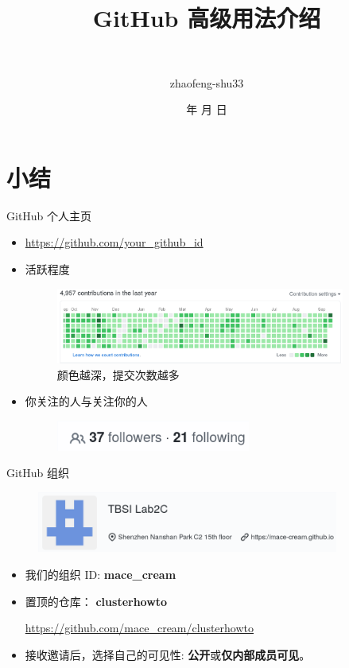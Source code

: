 \documentclass[notheorems,xetex]{beamer}
\title{GitHub 高级用法介绍} %
\author[赵丰]
{\quad {赵丰}\\ \and {zhaofeng-shu33}}
\institute[清华大学] %
{\normalsize\quad
  Lab2c 服务器使用培训
}
\date{\the\year 年 \the\month 月 \the\day 日}
\theoremstyle{definition}
\begin{document}
\frame{\titlepage}
\date{\hspace{1mm} \timemark}


\section{小结}
\begin{frame}{GitHub 个人主页}
\begin{itemize}
	\item \url{https://github.com/your_github_id}
	\item 活跃程度
     \begin{figure}
	\includegraphics[height=2.5cm]{activity.png}
	\caption*{颜色越深，提交次数越多}
	\end{figure}
	\item 你关注的人与关注你的人
	\begin{figure}
	\includegraphics[height=1cm]{ff.png}	
	\end{figure}
\end{itemize}
\end{frame}
\begin{frame}{GitHub 组织}
     \begin{figure}
	    \centering
		\includegraphics[height=2cm]{org.png}
	\end{figure}
\begin{itemize}
	\item 我们的组织 ID: \textbf{mace\_cream}
	\item 置顶的仓库： \textbf{clusterhowto}
	
	\url{https://github.com/mace_cream/clusterhowto}
	\item 接收邀请后，选择自己的可见性: \textbf{公开}或\textbf{仅内部成员可见}。
\end{itemize}
\end{frame}
\end{document}
